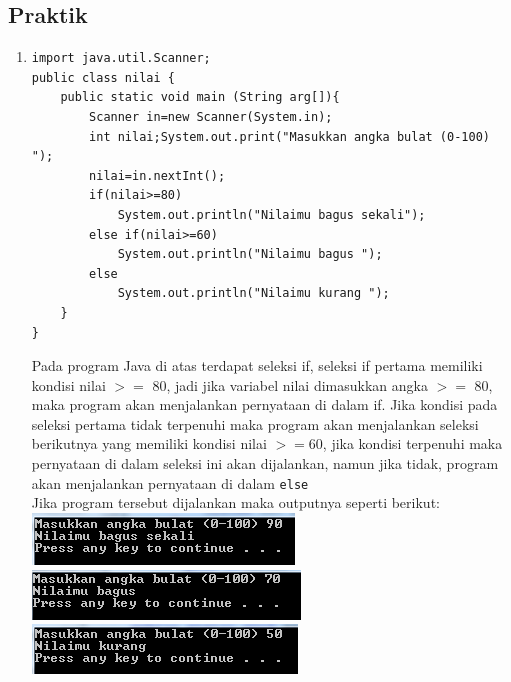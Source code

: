 \documentclass[a4paper,12pt]{article}
\begin{document}
\subsection{Praktik}
    \begin{enumerate}[label=\textbf{\arabic* .}]
        \item
    \begin{lstlisting}[frame=single]
import java.util.Scanner;
public class nilai {
    public static void main (String arg[]){
        Scanner in=new Scanner(System.in);
        int nilai;System.out.print("Masukkan angka bulat (0-100) ");
        nilai=in.nextInt();
        if(nilai>=80)
            System.out.println("Nilaimu bagus sekali");
        else if(nilai>=60)
            System.out.println("Nilaimu bagus ");
        else
            System.out.println("Nilaimu kurang ");
    }
}
    \end{lstlisting}
        Pada program Java di atas terdapat seleksi if, seleksi if pertama memiliki kondisi nilai $>=$ 80, jadi jika variabel nilai dimasukkan angka $>=$ 80, maka program akan menjalankan 
        pernyataan di dalam if. Jika kondisi pada seleksi pertama tidak terpenuhi maka program akan menjalankan seleksi berikutnya yang memiliki kondisi nilai $>=60$, jika kondisi terpenuhi maka
        pernyataan di dalam seleksi ini akan dijalankan, namun jika tidak, program akan menjalankan pernyataan di dalam \texttt{else}\\
        Jika program tersebut dijalankan maka outputnya seperti berikut:\\
            \includegraphics{01b.PNG} \includegraphics{01c.PNG}
            \includegraphics{01d.PNG}


\end{enumerate}
\end{document}
